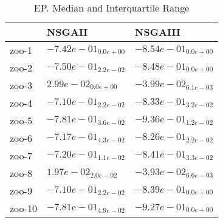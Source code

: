 \documentclass{article}
\begin{document}
\begin{table}
\caption{EP. Median and Interquartile Range}
\label{table: EP}
\centering
\begin{scriptsize}
\begin{tabular}{lll}
\hline & NSGAII &  NSGAIII\\
\hline 
zoo-1 & \cellcolor{gray25}$ -7.42e-01_{ 0.0e+00}$ & \cellcolor{gray95}$ -8.54e-01_{ 0.0e+00}$ \\
zoo-2 & \cellcolor{gray25}$ -7.50e-01_{ 2.2e-02}$ & \cellcolor{gray95}$ -8.48e-01_{ 0.0e+00}$ \\
zoo-3 & \cellcolor{gray25}$  2.99e-02_{ 0.0e+00}$ & \cellcolor{gray95}$ -3.99e-02_{ 6.1e-03}$ \\
zoo-4 & \cellcolor{gray25}$ -7.10e-01_{ 2.2e-02}$ & \cellcolor{gray95}$ -8.33e-01_{ 3.2e-02}$ \\
zoo-5 & \cellcolor{gray25}$ -7.81e-01_{ 3.6e-02}$ & \cellcolor{gray95}$ -9.36e-01_{ 1.2e-02}$ \\
zoo-6 & \cellcolor{gray25}$ -7.17e-01_{ 4.3e-02}$ & \cellcolor{gray95}$ -8.26e-01_{ 2.2e-02}$ \\
zoo-7 & \cellcolor{gray25}$ -7.20e-01_{ 1.1e-02}$ & \cellcolor{gray95}$ -8.41e-01_{ 3.3e-02}$ \\
zoo-8 & \cellcolor{gray25}$  1.97e-02_{ 2.0e-02}$ & \cellcolor{gray95}$ -3.93e-02_{ 6.6e-03}$ \\
zoo-9 & \cellcolor{gray25}$ -7.10e-01_{ 2.2e-02}$ & \cellcolor{gray95}$ -8.39e-01_{ 0.0e+00}$ \\
zoo-10 & \cellcolor{gray25}$ -7.81e-01_{ 4.9e-02}$ & \cellcolor{gray95}$ -9.27e-01_{ 0.0e+00}$ \\
\hline
\end{tabular}
\end{scriptsize}
\end{table}
\end{document}
